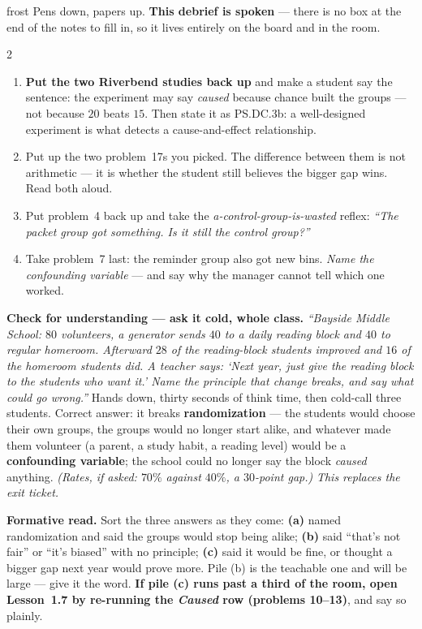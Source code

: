 \documentclass[10pt]{article}
\begin{document}
\boxguard[24]
\begin{skillbox}{frost}
Pens down, papers up. \textbf{This debrief is spoken} --- there is no box at the end of the
notes to fill in, so it lives entirely on the board and in the room.
\begin{multicols}{2}
\begin{enumerate}[leftmargin=1.3em, nosep, itemsep=3pt]
  \item \textbf{Put the two Riverbend studies back up} and make a student say the sentence:
        the experiment may say \emph{caused} because chance built the groups --- not because
        $20$ beats $15$. Then state it as PS.DC.3b: a well-designed experiment is what detects
        a cause-and-effect relationship.
  \item Put up the two problem~17s you picked. The difference between them is not arithmetic
        --- it is whether the student still believes the bigger gap wins. Read both aloud.
  \item Put problem~4 back up and take the \emph{a-control-group-is-wasted} reflex:
        \emph{``The packet group got something. Is it still the control group?''}
  \item Take problem~7 last: the reminder group also got new bins. \emph{Name the confounding
        variable} --- and say why the manager cannot tell which one worked.
\end{enumerate}
\columnbreak
\textbf{Check for understanding --- ask it cold, whole class.} \emph{``Bayside Middle School:
$80$ volunteers, a generator sends $40$ to a daily reading block and $40$ to regular homeroom.
Afterward $28$ of the reading-block students improved and $16$ of the homeroom students did. A
teacher says: `Next year, just give the reading block to the students who want it.' Name the
principle that change breaks, and say what could go wrong.''} Hands down, thirty seconds of
think time, then cold-call three students. Correct answer: it breaks \textbf{randomization}
--- the students would choose their own groups, the groups would no longer start alike, and
whatever made them volunteer (a parent, a study habit, a reading level) would be a
\textbf{confounding variable}; the school could no longer say the block \emph{caused}
anything. \emph{(Rates, if asked: $70\%$ against $40\%$, a $30$-point gap.)} \emph{This
replaces the exit ticket.}

\textbf{Formative read.} Sort the three answers as they come: \textbf{(a)} named
randomization and said the groups would stop being alike; \textbf{(b)} said ``that's not fair''
or ``it's biased'' with no principle; \textbf{(c)} said it would be fine, or thought a bigger
gap next year would prove more. Pile (b) is the teachable one and will be large --- give it
the word. \textbf{If pile (c) runs past a third of the room, open Lesson~1.7 by re-running the
\emph{Caused} row (problems 10--13)}, and say so plainly.


\end{multicols}
\end{skillbox}
\end{document}
